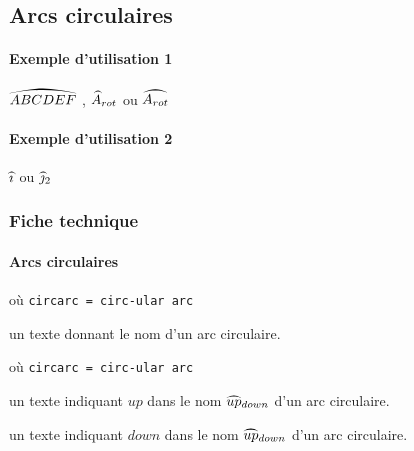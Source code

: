 \documentclass[12pt,a4paper]{article}
\begin{document}

\subsection{Arcs circulaires}

\paragraph{Exemple d'utilisation 1}

\begin{latexex}
$\circarc{ABCDEF}$ ,
$\circarc*{A}{rot}$ ou
$\circarc{A_{rot}}$
\end{latexex}




\paragraph{Exemple d'utilisation 2}

\begin{latexex}
$\circarc{i}$ ou
$\circarc*{j}{2}$
\end{latexex}




\subsubsection{Fiche technique}

\paragraph{Arcs circulaires}

 où \quad \verb+circarc = circ-ular arc+

\IDarg{} un texte donnant le nom d'un arc circulaire.


\separation


 où \quad \verb+circarc = circ-ular arc+

 un texte indiquant $up$ dans le nom $\circarc*{up}{down}$ d'un arc circulaire.

 un texte indiquant $down$ dans le nom $\circarc*{up}{down}$ d'un arc circulaire.
\end{document}
